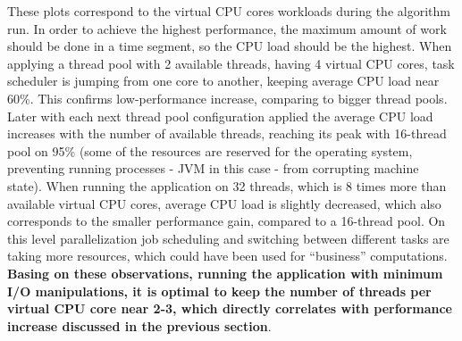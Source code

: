 These plots correspond to the virtual CPU cores workloads during the algorithm run. In order to achieve the highest performance, the maximum amount of work should be done in a time segment, so the CPU load should be the highest. When applying a  thread pool with 2 available threads, having 4 virtual CPU cores, task scheduler is jumping from one core to another, keeping average CPU load near 60\%. This confirms low-performance increase, comparing to bigger thread pools. Later with each next thread pool configuration applied the average CPU load increases with the number of available threads, reaching its peak with 16-thread pool on 95\% (some of the resources are reserved for the operating system, preventing running processes - JVM in this case - from corrupting machine state). When running the application on 32 threads, which is 8 times more than available virtual CPU cores, average CPU load is slightly decreased, which also corresponds to the smaller performance gain, compared to a 16-thread pool. On this level parallelization job scheduling and switching between different tasks are taking more resources, which could have been used for ``business'' computations. \textbf{Basing on these observations, running the application with minimum I/O manipulations, it is optimal to keep the number of threads per virtual CPU core near 2-3, which directly correlates with performance increase discussed in the previous section}.
